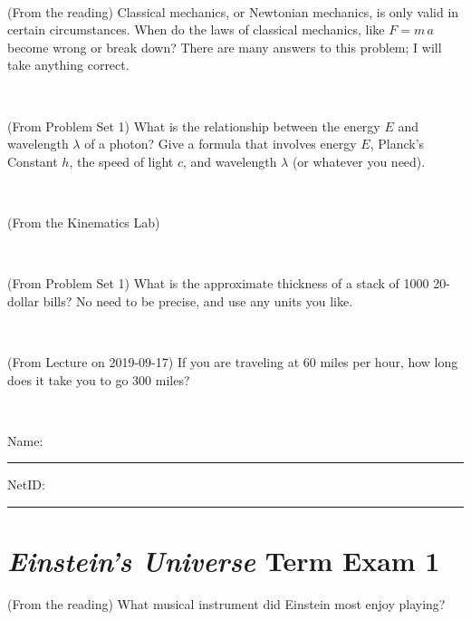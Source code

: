 \documentclass[12pt, letterpaper]{article}
\begin{document}
\vfill ~

\begin{problem} (From the reading)
Classical mechanics, or Newtonian mechanics, is only valid in certain
circumstances. When do the laws of classical mechanics, like $F =
m\,a$ become wrong or break down? There are many answers to this
problem; I will take anything correct.
\end{problem}


\vfill ~


\clearpage


\begin{problem} (From Problem Set 1)
What is the relationship between the energy $E$ and wavelength
$\lambda$ of a photon? Give a formula that involves energy $E$,
Planck's Constant $h$, the speed of light $c$, and wavelength
$\lambda$ (or whatever you need).
\end{problem}

\vfill ~

\begin{problem} (From the Kinematics Lab)

\end{problem}


\vfill ~

\begin{problem} (From Problem Set 1)
What is the approximate thickness of a stack of 1000 20-dollar bills?
No need to be precise, and use any units you like.
\end{problem}


\vfill ~

\begin{problem} (From Lecture on 2019-09-17)
If you are traveling at 60 miles per hour, how long does
it take you to go 300 miles?
\end{problem}


\vfill ~


\cleardoublepage



\noindent
Name: \rule[-1ex]{0.60\textwidth}{0.1pt}
NetID: \rule[-1ex]{0.20\textwidth}{0.1pt}

\section*{\textsl{Einstein's Universe} Term Exam 1}
\setcounter{problem}{1}


\begin{problem} (From the reading)
What musical instrument did Einstein most enjoy playing?
\end{problem}
\end{document}
